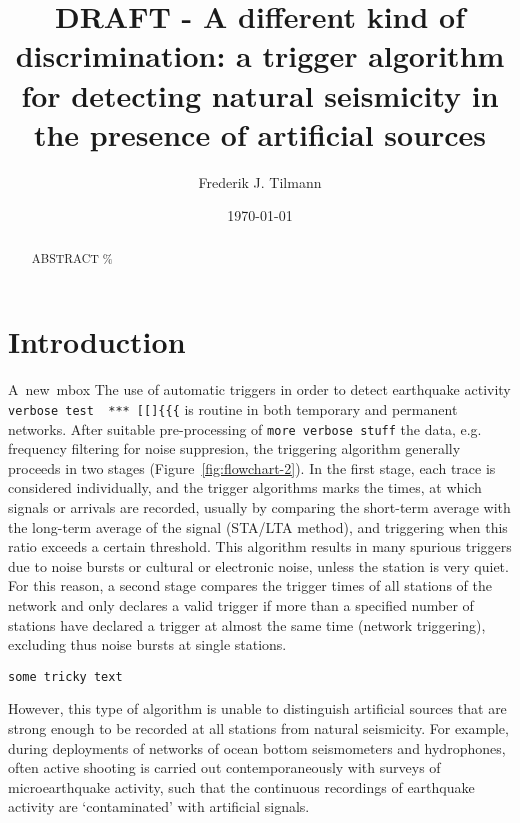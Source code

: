 \documentclass[11pt]{article}
\title{DRAFT -    A different kind of discrimination: a trigger algorithm for detecting natural seismicity in the presence of artificial sources}
\author{Frederik J. Tilmann}
\date{\today}
\begin{document}
\maketitle

\begin{abstract}
ABSTRACT \% %
\\%
\end{abstract}

\section{Introduction}

\mbox{A new mbox}
The use of automatic triggers in order to detect earthquake activity \verb|verbose test  *** [[]{{{|
is routine in both temporary and permanent networks.   After suitable pre-processing of \verb|more verbose stuff|
the data, e.g. frequency filtering for noise suppresion, the
triggering algorithm generally proceeds in two stages
(Figure~\ref{fig:flowchart-2}).  In the first stage, each trace is considered
individually, and the trigger algorithms marks the times, at which
signals or arrivals are recorded, usually by comparing the short-term
average with the long-term average of the signal (STA/LTA method), and
triggering when this ratio exceeds a certain threshold.  This
algorithm results in many spurious triggers due to noise bursts or
cultural or electronic noise, unless the station is very quiet.  For
this reason, a second stage compares the trigger times of all stations
of the network and only declares a valid trigger if more than a
specified number of stations have declared a trigger at almost the
same time (network triggering), excluding thus noise bursts at single stations.  
\begin{verbatim}
some tricky text
\end{verbatim}
However, this type of algorithm is unable to distinguish artificial
sources that are strong enough to be recorded at all stations from
natural seismicity. For example, during deployments of networks of ocean bottom
seismometers and hydrophones, often active shooting is carried out
contemporaneously with surveys of microearthquake activity, such that
the continuous recordings of earthquake activity are `contaminated' with artificial signals.
\end{document}
